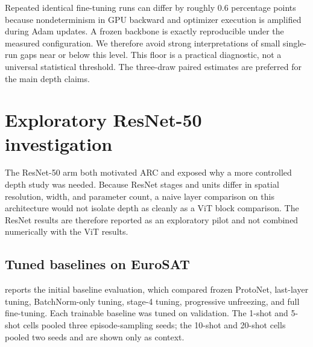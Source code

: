 \documentclass[11pt]{article}
\begin{document}
Repeated identical fine-tuning runs can differ by roughly 0.6 percentage points because nondeterminism in GPU backward and optimizer execution is amplified during Adam updates. A frozen backbone is exactly reproducible under the measured configuration. We therefore avoid strong interpretations of small single-run gaps near or below this level. This floor is a practical diagnostic, not a universal statistical threshold. The three-draw paired estimates are preferred for the main depth claims.

\section{Exploratory ResNet-50 investigation}
\label{sec:resnet}

The ResNet-50 arm both motivated ARC and exposed why a more controlled depth study was needed. Because ResNet stages and units differ in spatial resolution, width, and parameter count, a naive layer comparison on this architecture would not isolate depth as cleanly as a ViT block comparison. The ResNet results are therefore reported as an exploratory pilot and not combined numerically with the ViT results.

\subsection{Tuned baselines on EuroSAT}

 reports the initial baseline evaluation, which compared frozen ProtoNet, last-layer tuning, BatchNorm-only tuning, stage-4 tuning, progressive unfreezing, and full fine-tuning. Each trainable baseline was tuned on validation. The 1-shot and 5-shot cells pooled three episode-sampling seeds; the 10-shot and 20-shot cells pooled two seeds and are shown only as context.
\end{document}
